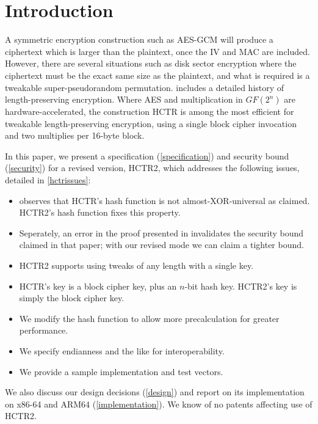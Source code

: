 \documentclass[hctr.tex]{subfiles}
\begin{document}
\section{Introduction}
A symmetric encryption construction such as AES-GCM\cite{gcm}
will produce a ciphertext which is larger than
the plaintext, once the IV and MAC are included. However,
there are several situations such as disk sector encryption
where the ciphertext must be the exact same size as the
plaintext, and what is required is a tweakable
super-pseudorandom permutation\cite{cmc}. 
\cite{adiantum} includes a detailed history of length-preserving encryption.
Where AES and multiplication in \(GF(2^n)\) are hardware-accelerated,
the construction HCTR\cite{hctr} is among the most efficient for 
tweakable length-preserving encryption, using
a single block cipher invocation and two multiplies
per 16-byte block.

In this paper, we present 
a specification (\autoref{specification})
and security bound (\autoref{security})
for a revised version, HCTR2, which 
addresses the following issues, detailed in \autoref{hctrissues}:
\begin{itemize}
    \item \cite{kumarhctr} observes that HCTR's hash function
    is not almost-XOR-universal\cite{eadu} as claimed.
    HCTR2's hash function fixes this property.
    \item Seperately,
    an error in the proof presented in \cite{hctrquad}
    invalidates the security bound claimed in that paper; with our revised
    mode we can claim a tighter bound.
    \item HCTR2 supports using tweaks of any length with a single key.
    \item HCTR's key is a block cipher key, plus an \(n\)-bit
    hash key. HCTR2's key is simply
    the block cipher key.
    \item We modify the hash function to allow more precalculation
    for greater performance.
    \item We specify endianness and the like for interoperability.
    \item We provide a sample implementation and test vectors.
\end{itemize}
We also discuss our design decisions (\autoref{design})
and report on its implementation on x86-64 and ARM64 (\autoref{implementation}).
We know of no patents affecting use of HCTR2.
\end{document}
